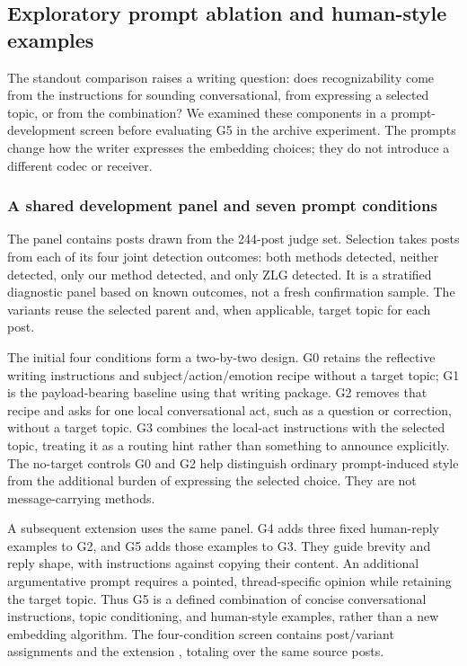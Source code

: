 \subsection{Exploratory prompt ablation and human-style examples}
\label{sec:prompt-ablation}

The standout comparison raises a writing question: does recognizability come from the instructions for sounding conversational, from expressing a selected topic, or from the combination? We examined these components in a prompt-development screen before evaluating G5 in the archive experiment. The prompts change how the writer expresses the embedding choices; they do not introduce a different codec or receiver.

\subsubsection{A shared development panel and seven prompt conditions}
The panel contains \PaPosts{} posts drawn from the 244-post judge set. Selection takes \PaStratumPosts{} posts from each of its four joint detection outcomes: both methods detected, neither detected, only our method detected, and only ZLG detected. It is a stratified diagnostic panel based on known outcomes, not a fresh confirmation sample. The variants reuse the selected parent and, when applicable, target topic for each post.

The initial four conditions form a two-by-two design. G0 retains the reflective writing instructions and subject/action/emotion recipe without a target topic; G1 is the payload-bearing baseline using that writing package. G2 removes that recipe and asks for one local conversational act, such as a question or correction, without a target topic. G3 combines the local-act instructions with the selected topic, treating it as a routing hint rather than something to announce explicitly. The no-target controls G0 and G2 help distinguish ordinary prompt-induced style from the additional burden of expressing the selected choice. They are not message-carrying methods.

A subsequent extension uses the same panel. G4 adds three fixed human-reply examples to G2, and G5 adds those examples to G3. They guide brevity and reply shape, with instructions against copying their content. An additional argumentative prompt requires a pointed, thread-specific opinion while retaining the target topic. Thus G5 is a defined combination of concise conversational instructions, topic conditioning, and human-style examples, rather than a new embedding algorithm. The four-condition screen contains \PaPrimaryAttempts{} post/variant assignments and the extension \PaExtensionAttempts{}, totaling \PaGenerationAttempts{} over the same \PaPosts{} source posts.

